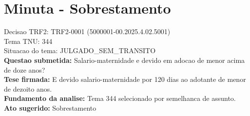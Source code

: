 \documentclass{article}
\begin{document}
\section*{Minuta - Sobrestamento}
Decisao TRF2: TRF2-0001 (5000001-00.2025.4.02.5001)\\
Tema TNU: 344\\
Situacao do tema: JULGADO\_SEM\_TRANSITO\\
\textbf{Questao submetida:} Salario-maternidade e devido em adocao de menor acima de doze anos?\\
\textbf{Tese firmada:} E devido salario-maternidade por 120 dias ao adotante de menor de dezoito anos.\\
\textbf{Fundamento da analise:} Tema 344 selecionado por semelhanca de assunto.\\
\textbf{Ato sugerido:} Sobrestamento
\end{document}
